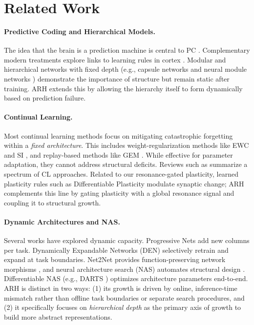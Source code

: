 \documentclass{article}
\numberwithin{figure}{section}
\numberwithin{table}{section}
\numberwithin{algorithm}{section}
\begin{document}
\section{Related Work}
\paragraph{Predictive Coding and Hierarchical Models.} The idea that the brain is a prediction machine is central to PC \citep{Rao1999,Friston2010}. Complementary modern treatments explore links to learning rules in cortex \citep{Whittington2019}. Modular and hierarchical networks with fixed depth (e.g., capsule networks \citep{Sabour2017} and neural module networks \citep{Andreas2016}) demonstrate the importance of structure but remain static after training. ARH extends this by allowing the hierarchy itself to form dynamically based on prediction failure.

\paragraph{Continual Learning.} Most continual learning methods focus on mitigating catastrophic forgetting within a \emph{fixed architecture}. This includes weight-regularization methods like EWC \citep{Kirkpatrick2017} and SI \citep{Zenke2017}, and replay-based methods like GEM \citep{LopezPaz2017}. While effective for parameter adaptation, they cannot address structural deficits. Reviews such as \citep{Parisi2019} summarize a spectrum of CL approaches. Related to our resonance-gated plasticity, learned plasticity rules such as Differentiable Plasticity \citep{Miconi2018} modulate synaptic change; ARH complements this line by gating plasticity with a global resonance signal and coupling it to structural growth.

\paragraph{Dynamic Architectures and NAS.} Several works have explored dynamic capacity. Progressive Nets \citep{Rusu2016} add new columns per task. Dynamically Expandable Networks (DEN) \citep{Yoon2018} selectively retrain and expand at task boundaries. Net2Net provides function-preserving network morphisms \citep{Chen2016}, and neural architecture search (NAS) automates structural design \citep{Zoph2017}. Differentiable NAS (e.g., DARTS \citep{Liu2019}) optimizes architecture parameters end-to-end. ARH is distinct in two ways: (1) its growth is driven by online, inference-time mismatch rather than offline task boundaries or separate search procedures, and (2) it specifically focuses on \emph{hierarchical depth} as the primary axis of growth to build more abstract representations.
\end{document}
